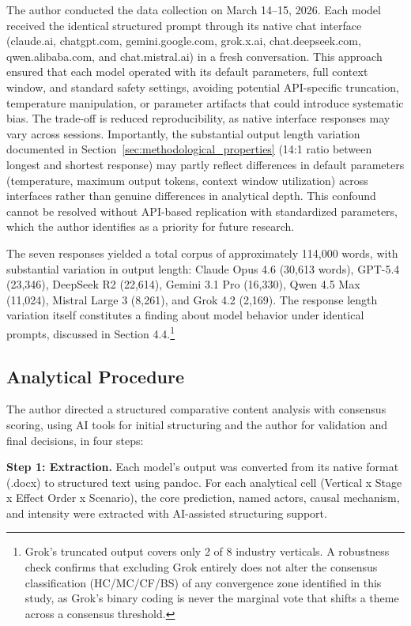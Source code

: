 \documentclass[preprint,review,12pt]{elsarticle}
\begin{document}
The author conducted the data collection on March 14--15, 2026. Each model received the identical structured prompt through its native chat interface (claude.ai, chatgpt.com, gemini.google.com, grok.x.ai, chat.deepseek.com, qwen.alibaba.com, and chat.mistral.ai) in a fresh conversation. This approach ensured that each model operated with its default parameters, full context window, and standard safety settings, avoiding potential API-specific truncation, temperature manipulation, or parameter artifacts that could introduce systematic bias. The trade-off is reduced reproducibility, as native interface responses may vary across sessions. Importantly, the substantial output length variation documented in Section~\ref{sec:methodological_properties} (14:1 ratio between longest and shortest response) may partly reflect differences in default parameters (temperature, maximum output tokens, context window utilization) across interfaces rather than genuine differences in analytical depth. This confound cannot be resolved without API-based replication with standardized parameters, which the author identifies as a priority for future research.

The seven responses yielded a total corpus of approximately 114,000 words, with substantial variation in output length: Claude Opus 4.6 (30,613 words), GPT-5.4 (23,346), DeepSeek R2 (22,614), Gemini 3.1 Pro (16,330), Qwen 4.5 Max (11,024), Mistral Large 3 (8,261), and Grok 4.2 (2,169). The response length variation itself constitutes a finding about model behavior under identical prompts, discussed in Section 4.4.\footnote{Grok's truncated output covers only 2 of 8 industry verticals. A robustness check confirms that excluding Grok entirely does not alter the consensus classification (HC/MC/CF/BS) of any convergence zone identified in this study, as Grok's binary coding is never the marginal vote that shifts a theme across a consensus threshold.}


\subsection{Analytical Procedure}
\label{sec:analytical_procedure}

The author directed a structured comparative content analysis with consensus scoring, using AI tools for initial structuring and the author for validation and final decisions, in four steps:

\textbf{Step 1: Extraction.} Each model's output was converted from its native format (.docx) to structured text using pandoc. For each analytical cell (Vertical x Stage x Effect Order x Scenario), the core prediction, named actors, causal mechanism, and intensity were extracted with AI-assisted structuring support.
\end{document}
